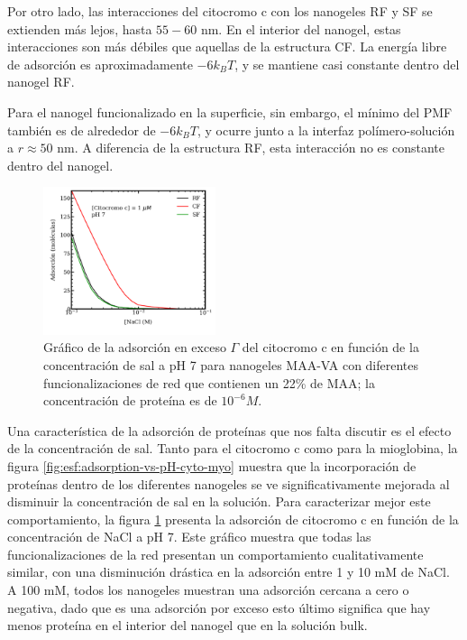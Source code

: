 Por otro lado, las interacciones del citocromo c con los nanogeles RF y SF se extienden m\'as lejos, hasta $55-60$ nm. En el interior del nanogel, estas interacciones son m\'as d\'ebiles que aquellas de la estructura CF. La energ\'ia libre de adsorci\'on es aproximadamente $-6 k_BT$, y se mantiene casi constante dentro del nanogel RF.

Para el nanogel funcionalizado en la superficie, sin embargo, el m\'inimo del PMF tambi\'en es de alrededor de $-6 k_BT$, y ocurre junto a la interfaz pol\'imero-soluci\'on a $r\approx 50$ nm. A diferencia de la estructura RF, esta interacci\'on no es constante dentro del nanogel. 





\begin{figure}[!htb]
     \centering
     \includegraphics[width=0.45\textwidth]{Figures/graphs-gel2/gamma-salts-cito.pdf}
     \caption{Gr\'afico de la adsorci\'on en exceso $\Gamma$ del citocromo c en funci\'on de la concentraci\'on de sal a pH 7 para nanogeles MAA-VA con diferentes funcionalizaciones de red que contienen un 22\% de MAA; la concentraci\'on de prote\'ina es de $10^{-6}M$.}
     \label{fig:esf:adsorption-vs-salt-cyto}
 \end{figure}
 

Una caracter\'istica de la adsorci\'on de prote\'inas que nos falta discutir es el efecto de la concentraci\'on de sal.
Tanto para el citocromo c como para la mioglobina, la figura \ref{fig:esf:adsorption-vs-pH-cyto-myo} muestra que la incorporaci\'on de prote\'inas dentro de los diferentes nanogeles se ve significativamente mejorada al disminuir la concentraci\'on de sal en la soluci\'on.
Para caracterizar mejor este comportamiento, la figura \ref{fig:esf:adsorption-vs-salt-cyto} presenta la adsorci\'on de citocromo c en funci\'on de la concentraci\'on de NaCl a pH 7.
Este gr\'afico muestra que todas las funcionalizaciones de la red presentan un comportamiento cualitativamente similar, con una disminuci\'on dr\'astica en la adsorci\'on entre 1 y 10 mM de NaCl.
A 100 mM, todos los nanogeles muestran una adsorci\'on cercana a cero o negativa, dado que es una adsorci\'on por exceso esto \'ultimo significa que hay menos prote\'ina en el interior del nanogel que en la soluci\'on bulk.

